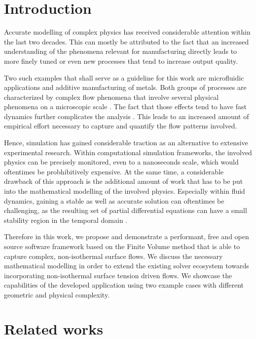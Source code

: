 \documentclass[conference,final]{IEEEtran}
\begin{document}
\section{Introduction}

Accurate modelling of complex physics has received considerable attention within the last two decades.
This can mostly be attributed to the fact that an increased understanding of the phenomena relevant for manufacturing directly leads to more finely tuned or even new processes that tend to increase output quality.

Two such examples that shall serve as a guideline for this work are microfluidic applications and additive manufacturing of metals.
Both groups of processes are characterized by complex flow phenomena that involve several physical phenomena on a microscopic scale \cite{sackmannPresentFutureRole,debroyAdditiveManufacturingMetallic2018}. The fact that those effects tend to have fast dynamics further complicates the analysis \cite{khairallahControllingInterdependentMesonanosecond2020}. This leads to an increased amount of empirical effort necessary to capture and quantify the flow patterns involved.

Hence, simulation has gained considerable traction as an alternative to extensive experimental research. Within computational simulation frameworks, the involved physics can be precisely monitored, even to a nanoseconds scale, which would oftentimes be probhibitively expensive. At the same time, a considerable drawback of this approach is the additional amount of work that has to be put into the mathematical modelling of the involved physics. Especially within fluid dynamics, gaining a stable as well as accurate solution can oftentimes be challenging, as the resulting set of partial differential equations can have a small stability region in the temporal domain \cite{laxStabilityDifferenceSchemes2013}.

Therefore in this work, we propose and demonstrate a performant, free and open source software framework based on the Finite Volume method that is able to capture complex, non-isothermal surface flows. We discuss the necessary mathematical modelling in order to extend the existing solver ecosystem towards incorporating non-isothermal surface tension driven flows. We showcase the capabilities of the developed application using two example cases with different geometric and physical complexity.

\section{Related works}
\end{document}
